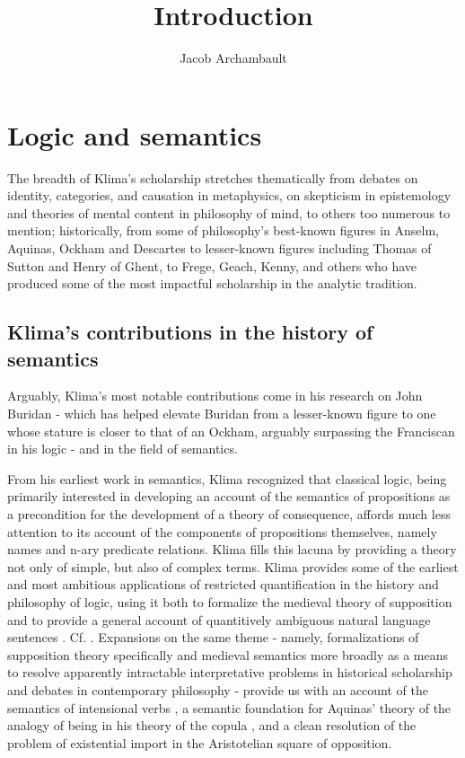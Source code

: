 \documentclass[]{article}
\title{Introduction}
\author{Jacob Archambault}
\begin{document}
\maketitle

\begin{abstract}

\end{abstract}

\section{Logic and semantics}
The breadth of Klima's scholarship stretches thematically from debates on identity, categories, and causation in metaphysics, 
on skepticism in epistemology and theories of mental content in philosophy of mind, to others too numerous to mention; historically, from some of philosophy's best-known figures in Anselm, Aquinas, Ockham and Descartes 
to lesser-known figures including Thomas of Sutton and Henry of Ghent, 
to Frege, Geach, Kenny, and others who have produced some of the most impactful scholarship in the analytic tradition. 

\subsection{Klima's contributions in the history of semantics}
Arguably, Klima's most notable contributions come in his research on John Buridan 
- which has helped elevate Buridan from a lesser-known figure to one whose stature is closer to that of an Ockham, arguably surpassing the Franciscan in his logic - 
and in the field of semantics. 

From his earliest work in semantics, 
Klima recognized that classical logic, 
being primarily interested in developing an account of the semantics of propositions as a precondition for the development of a theory of consequence, 
affords much less attention to its account of the components of propositions themselves, 
namely names and n-ary predicate relations. 
Klima fills this lacuna by providing a theory not only of simple, 
but also of complex terms.
Klima provides some of the earliest and most ambitious applications of restricted quantification in the history and philosophy of logic, 
using it both to formalize the medieval theory of supposition 
and to provide a general account of quantitively ambiguous natural language sentences \autocite{Klima1988,Klima1990,KlimaSandu1990,Klima1991b}. Cf. \autocite{Parsons2014}. 
Expansions on the same theme - 
namely, formalizations of supposition theory specifically 
and medieval semantics more broadly 
as a means to resolve apparently intractable interpretative problems in historical scholarship 
and debates in contemporary philosophy - 
provide us with an account of the semantics of intensional verbs \autocite{Klima1991}, 
a semantic foundation for Aquinas' theory of the analogy of being in his theory of the copula \autocite{Klima1996,Klima2002}, 
and a clean resolution of the problem of existential import in the Aristotelian square of opposition\autocite{Klima2001}. 
\end{document}
